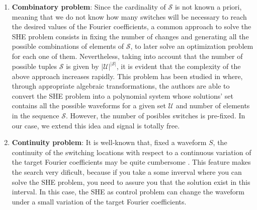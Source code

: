 \begin{enumerate}
    \item \textbf{Combinatory problem}: Since the cardinality of $\mathcal S$ is not known a priori, meaning that we do not know how many switches will be necessary to reach the desired values of the Fourier coefficients, a common approach to solve the SHE problem consists in fixing the number of changes and generating all the possible combinations of elements of $\mathcal S$, to later solve an optimization problem for each one of them. Nevertheless, taking into account that the number of possible tuples $\mathcal S$ is given by $|\mathcal{U}|^{|\mathcal S|}$, it is evident that the complexity of the above approach increases rapidly. This problem has been studied in \cite{Yang2015} where, through appropriate algebraic transformations, the authors are able to convert the SHE problem into a polynomial system whose solutions' set contains all the possible waveforms for a given set $\mathcal{U}$ and number of elements in the sequence $\mathcal S$.  However, the number of posibles switches is pre-fixed. In our case, we extend this idea and signal is totally free.

	\item \textbf{Continuity problem}: It is well-known that, fixed a waveform $S$, the continuity of the switching locations with respect to a continuous variation of the target Fourier coefficients may be quite cumbersome \cite{Yang2017}. 
	This feature makes the search very dificult, because if you take a some inverval where you can solve the SHE problem, you need to assure you that the solution exist in this interval.
	In this case, the SHE as control problem can change the waveform under a small variation of the target Fourier coefficients.
\end{enumerate}
%
%

%
%
